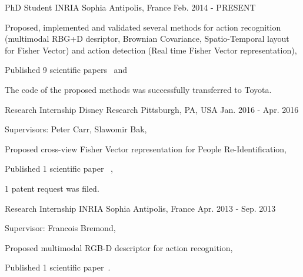 

\begin{cventries}

  \cventry
    {PhD Student} %
    {INRIA} %
    {Sophia Antipolis, France} %
    {Feb. 2014 - PRESENT} %
    {
      \begin{cvitems} %
        \item {Proposed, implemented and validated several methods for action recognition (multimodal RBG+D desriptor, Brownian Covariance, Spatio-Temporal layout for Fisher Vector) and action detection (Real time Fisher Vector representation), }
        \item {Published 9 scientific papers~\cite{Crispim:2017, Das:2017, koperski:2016, Crispim:2016, Negin:2016, Negin:2015, ortiz:2015, Bilinski:2014, koperski:2014} and~\cite{koperskiphd:2017}}
        \item {The code of the proposed methods was successfully transferred to Toyota.}
      \end{cvitems}
    }

  \cventry
    {Research Internship} %
    {Disney Research} %
    {Pittsburgh, PA, USA} %
    {Jan. 2016 - Apr. 2016} %
    {
      \begin{cvitems} %
        \item {Supervisors: Peter Carr, Slawomir Bak,}
        \item {Proposed cross-view Fisher Vector representation for People Re-Identification,}
        \item {Published 1 scientific paper~\cite{koperski:2017}
,}
        \item {1 patent request was filed.}        
      \end{cvitems}
    }

  \cventry
    {Research Internship} %
    {INRIA} %
    {Sophia Antipolis, France} %
    {Apr. 2013 - Sep. 2013} %
    {
      \begin{cvitems} %
        \item {Supervisor: Francois Bremond,}
        \item {Proposed multimodal RGB-D descriptor for action recognition,}
        \item {Published 1 scientific paper~\cite{koperski:2014}.}
      \end{cvitems}
    }


\end{cventries}
